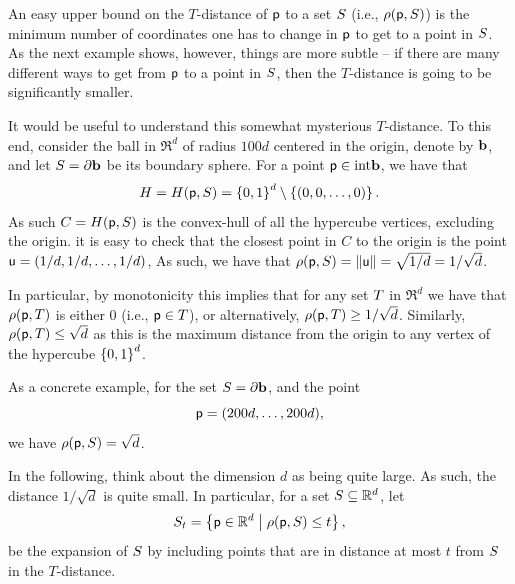 \begin{observation}
    An easy upper bound on the $T$-distance of $\mathsf{p}$ to a set $S$
    (i.e., $\distTY{\pnt}{\SetA}$) is the minimum number of
    coordinates one has to change in $\mathsf{p}$ to get to a point in
    $S$. As the next example shows, however, things are more
    subtle -- if there are many different ways to get from $\mathsf{p}$ to a
    point in $S$, then the $T$-distance is going to be
    significantly smaller.
\end{observation}


\begin{example}
    It would be useful to understand this somewhat mysterious
    $T$-distance. To this end, consider the ball in $\Re^d$ of radius
    $100d$ centered in the origin, denote by $\mathbf{b} $, and let
    $S ={\partial} \mathbf{b}$ be its boundary sphere. For a point
    $\mathsf{p} \in \mathrm{int} \mathbf{b}$, we have that
    \begin{equation*}
        H = \HSetY{\pnt}{\SetA} = \brc{0,1}^d \setminus \brc{(0,0, \ldots,
           0)}.
    \end{equation*}
    As such $C= \HSetY{\pnt}{\SetA}$ is the convex-hull of all the
    hypercube vertices, excluding the origin. it is easy to check that
    the closest point in $C$ to the origin is the point
    $\mathsf{u} = (1/d, 1/d, \ldots, 1/d)$, As such, we have that
    $\distTY{\pnt}{\SetA} = \norm{\pntA} = \sqrt{1/d} = 1/\sqrt{d}$.

    In particular, by monotonicity this implies that for any set
    $T$ in $\Re^d$ we have that $\distTY{\pnt}{\SetB}$ is either
    $0$ (i.e., $\mathsf{p} \in T$), or alternatively,
    $\distTY{\pnt}{\SetB} \geq 1/\sqrt{d}$. Similarly,
    $\distTY{\pnt}{\SetB} \leq \sqrt{d}$ as this is the maximum
    distance from the origin to any vertex of the hypercube
    $\left\{ {0,1} \right\}^d$.

    As a concrete example, for the set $S = {\partial} \mathbf{b}$, and the
    point 
    \begin{equation*}
        \mathsf{p} = (200d,\ldots, 200d),
    \end{equation*}
     we have
    $\distTY{\pnt}{\SetA} = \sqrt{d}$.
\end{example}


In the following, think about the dimension $d$ as being quite
large. As such, the distance $1/\sqrt{d}$ is quite small. In
particular, for a set $S \subseteq \mathbb{R}^d$, let
\begin{equation*}
    \SetA_t = \Set{ \pnt \in \Re^d}{\distTY{\pnt}{\SetA} \leq t},
\end{equation*}
be the expansion of $S$ by including points that are in distance
at most $t$ from $S$ in the $T$-distance.

